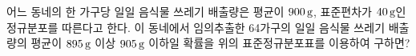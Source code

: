 \noindent\begin{minipage}[t]{0.58\linewidth}\vspace{0pt}\raggedright 어느 동네의 한 가구당 일일 음식물 쓰레기 배출량은 평균이 $900\mkern3mu \mathrm{g}$, 표준편차가 $40\mkern3mu \mathrm{g}$인 정규분포를 따른다고 한다. 이 동네에서 임의추출한 64가구의 일일 음식물 쓰레기 배출량의 평균이 $895\mkern3mu \mathrm{g}$ 이상 $905\mkern3mu \mathrm{g}$ 이하일 확률을 위의 표준정규분포표를 이용하여 구하면?\end{minipage}\hfill\begin{minipage}[t]{0.4\linewidth}\vspace{0pt}\centering \resizebox{\ifdim\width>\linewidth\linewidth\else\width\fi}{!}{}\end{minipage}\par
{}

